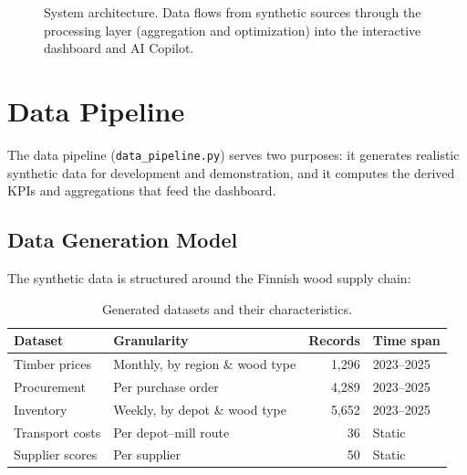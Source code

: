 \documentclass[11pt,a4paper]{article}
\begin{document}
\begin{figure}[H]
\caption{System architecture. Data flows from synthetic sources through the processing layer (aggregation and optimization) into the interactive dashboard and AI Copilot.}
\label{fig:architecture}
\end{figure}


\section{Data Pipeline}

The data pipeline (\texttt{data\_pipeline.py}) serves two purposes: it generates realistic synthetic data for development and demonstration, and it computes the derived KPIs and aggregations that feed the dashboard.

\subsection{Data Generation Model}

The synthetic data is structured around the Finnish wood supply chain:

\begin{table}[H]
\centering
\caption{Generated datasets and their characteristics.}
\label{tab:datasets}
\begin{tabular}{@{}llrl@{}}
\toprule
\textbf{Dataset} & \textbf{Granularity} & \textbf{Records} & \textbf{Time span} \\
\midrule
Timber prices     & Monthly, by region \& wood type  & 1,296  & 2023--2025 \\
Procurement       & Per purchase order               & 4,289  & 2023--2025 \\
Inventory         & Weekly, by depot \& wood type    & 5,652  & 2023--2025 \\
Transport costs   & Per depot--mill route            & 36     & Static \\
Supplier scores   & Per supplier                     & 50     & Static \\
\bottomrule
\end{tabular}
\end{table}
\end{document}
